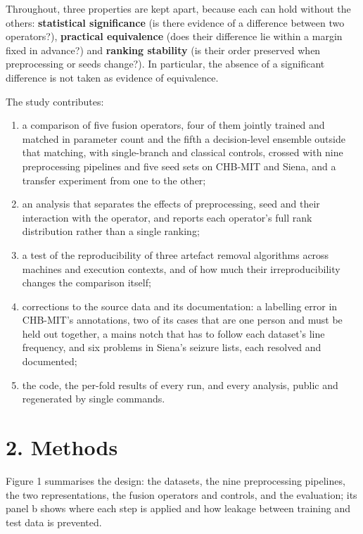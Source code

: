 \documentclass[11pt,a4paper]{article}
\providecommand{\tightlist}{%
  \setlength{\itemsep}{0pt}\setlength{\parskip}{0pt}}
\begin{document}
Throughout, three properties are kept apart, because each can hold without the
others: \textbf{statistical significance} (is there evidence of a difference between two
operators?), \textbf{practical equivalence} (does their difference lie within a margin
fixed in advance?) and \textbf{ranking stability} (is their order preserved when
preprocessing or seeds change?). In particular, the absence of a significant
difference is not taken as evidence of equivalence.

The study contributes:

\begin{enumerate}
\def\labelenumi{\arabic{enumi}.}
\tightlist
\item
  a comparison of five fusion operators, four of them jointly trained and matched in
  parameter count and the fifth a decision-level ensemble outside that matching, with
  single-branch and classical controls, crossed with nine preprocessing pipelines and five seed sets on
  CHB-MIT and Siena, and a transfer experiment from one to the other;
\item
  an analysis that separates the effects of preprocessing, seed and their interaction
  with the operator, and reports each operator's full rank distribution rather than a
  single ranking;
\item
  a test of the reproducibility of three artefact removal algorithms across machines
  and execution contexts, and of how much their irreproducibility changes the
  comparison itself;
\item
  corrections to the source data and its documentation: a labelling error in CHB-MIT's
  annotations, two of its cases that are one person and must be held out together, a
  mains notch that has to follow each dataset's line frequency, and six problems in
  Siena's seizure lists, each resolved and documented;
\item
  the code, the per-fold results of every run, and every analysis, public and
  regenerated by single commands.
\end{enumerate}

\section{2. Methods}\label{methods}

Figure 1 summarises the design: the
datasets, the nine preprocessing pipelines, the two representations, the fusion
operators and controls, and the evaluation; its panel b shows where each step is
applied and how leakage between training and test data is prevented.
\end{document}
